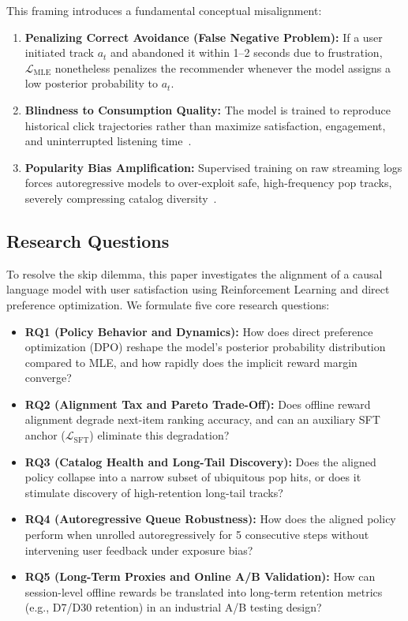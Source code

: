 This framing introduces a fundamental conceptual misalignment:
\begin{enumerate}
    \item \textbf{Penalizing Correct Avoidance (False Negative Problem):} If a user initiated track $a_t$ and abandoned it within 1--2 seconds due to frustration, $\mathcal{L}_{\text{MLE}}$ nonetheless penalizes the recommender whenever the model assigns a low posterior probability to $a_t$.
    \item \textbf{Blindness to Consumption Quality:} The model is trained to reproduce historical click trajectories rather than maximize satisfaction, engagement, and uninterrupted listening time~\cite{matveev2026session}.
    \item \textbf{Popularity Bias Amplification:} Supervised training on raw streaming logs forces autoregressive models to over-exploit safe, high-frequency pop tracks, severely compressing catalog diversity~\cite{petrov2024aligning}.
\end{enumerate}

\subsection{Research Questions}
To resolve the skip dilemma, this paper investigates the alignment of a causal language model with user satisfaction using Reinforcement Learning and direct preference optimization. We formulate five core research questions:
\begin{itemize}
    \item \textbf{RQ1 (Policy Behavior and Dynamics):} How does direct preference optimization (DPO) reshape the model's posterior probability distribution compared to MLE, and how rapidly does the implicit reward margin converge?
    \item \textbf{RQ2 (Alignment Tax and Pareto Trade-Off):} Does offline reward alignment degrade next-item ranking accuracy, and can an auxiliary SFT anchor ($\mathcal{L}_{\text{SFT}}$) eliminate this degradation?
    \item \textbf{RQ3 (Catalog Health and Long-Tail Discovery):} Does the aligned policy collapse into a narrow subset of ubiquitous pop hits, or does it stimulate discovery of high-retention long-tail tracks?
    \item \textbf{RQ4 (Autoregressive Queue Robustness):} How does the aligned policy perform when unrolled autoregressively for 5 consecutive steps without intervening user feedback under exposure bias?
    \item \textbf{RQ5 (Long-Term Proxies and Online A/B Validation):} How can session-level offline rewards be translated into long-term retention metrics (e.g., D7/D30 retention) in an industrial A/B testing design?
\end{itemize}


